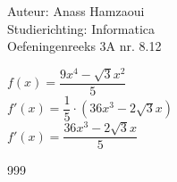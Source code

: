 \documentclass[a4paper]{article}
\begin{document}
  
\noindent \large Auteur: Anass Hamzaoui \\
\noindent \large Studierichting: Informatica \\
\noindent \large Oefeningenreeks 3A nr. 8.12\\

\medskip

\normalsize

$f(x) = \dfrac{9x^4-\sqrt{3}x^2}{5}$\\

$f'(x) = \dfrac{1}{5}\cdot (36x^3-2\sqrt{3}x)$\\

$f'(x) = \dfrac{36x^3-2\sqrt{3}x}{5}$\\

\begin{thebibliography}{999}
\end{thebibliography}
\end{document}
